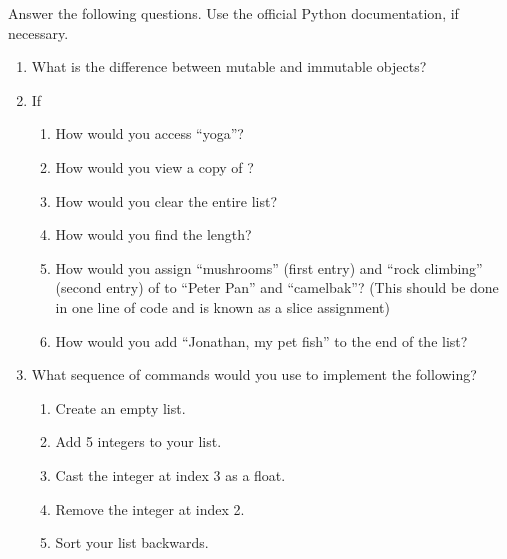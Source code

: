 \begin{problem}
Answer the following questions. Use the official Python documentation, if necessary.

\begin{enumerate}
\item What is the difference between mutable and immutable objects?
\item If 
\begin{enumerate}
\item How would you access ``yoga''? 
\item How would you view a copy of ?
\item How would you clear the entire list? 
\item How would you find the length? 
\item How would you assign ``mushrooms'' (first entry) and ``rock climbing'' (second entry) 
of  to ``Peter Pan'' and ``camelbak''? 
(This should be done in one line of code and is known as a slice assignment)
\item How would you add ``Jonathan, my pet fish'' to the end of the list?
\end{enumerate}
\item What sequence of commands would you use to implement the following?
\begin{enumerate}
\item Create an empty list. 
\item Add 5 integers to your list. 
\item Cast the integer at index 3 as a float.
\item Remove the integer at index 2. 
\item Sort your list backwards.
\end{enumerate}
\end{enumerate}
\end{problem}


